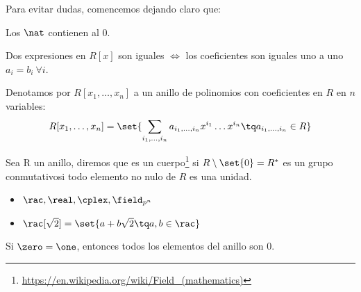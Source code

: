 Para evitar dudas, comencemos dejando claro que:

\begin{theorem}
Los $\nat$ contienen al 0.
\end{theorem}

\begin{theorem}
Dos expresiones en $R[x]$ son iguales $\iff$ los coeficientes son iguales uno a uno\ie $a_i = b_i \ \forall i$.
\end{theorem}

\begin{defn}
Denotamos por $R[x_1,\dots,x_n]$ a un anillo de polinomios con coeficientes en $R$ en $n$ variables:
\[ R[x_1,\dots,x_n] = \set{ \sum_{i_1,\dots,i_n} a_{i_1,\dots,i_n} x^{i_1}\dots x^{i_n} \tq a_{i_1,\dots,i_n} \in R } \]
\end{defn}


\begin{defn}[Cuerpo]
Sea R un anillo, diremos que es un cuerpo\footnote{\url{https://en.wikipedia.org/wiki/Field_(mathematics)}} si $R\setminus \set{0} = R^*$ es un grupo conmutativo\ie si todo elemento no nulo de $R$ es una unidad.
\end{defn}

\begin{example}
	\begin{itemize}
		\item $\rac, \real, \cplex, \field_{p^n}$ %
		\item $\rac[\sqrt2] = \set{ a + b\sqrt2 \tq a,b \in \rac }$
	\end{itemize}
\end{example}

\begin{prop}
	Si $\zero=\one$, entonces todos los elementos del anillo son 0.
\end{prop}




